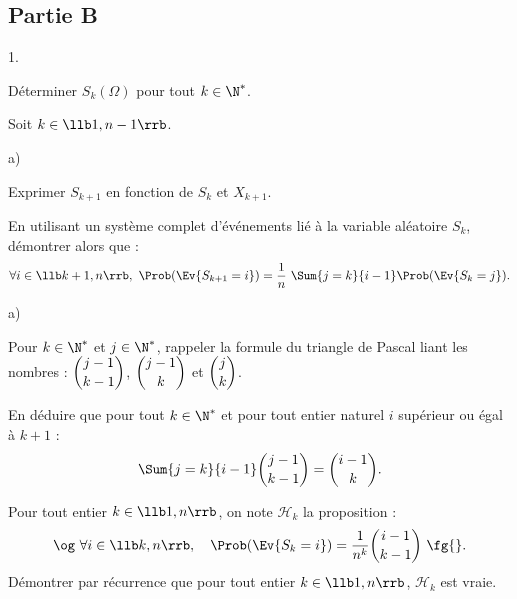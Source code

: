 

\subsection*{Partie B}

\begin{noliste}{1.}
  \setcounter{enumi}{4}
\item Déterminer $S_k(\Omega)$ pour tout $k\in\N^*$.
  
  




\item Soit $k\in\llb 1,n-1\rrb$.
  \begin{noliste}{a)}
  \item Exprimer $S_{k+1}$ en fonction de $S_k$ et $X_{k+1}$.
    
    
    
  \item En utilisant un système complet d'événements lié à la
    variable aléatoire $S_k$, démontrer alors que :
    \[
    \forall i \in\llb k+1,n\rrb, \ \Prob(\Ev{S_{k+1}=i}) =
    \dfrac{1}{n} \ \Sum{j=k}{i-1} \Prob(\Ev{S_k=j}).
    \]
    
    
  \end{noliste}
  
\item 
  \begin{noliste}{a)}
  \item Pour $k\in\N^*$ et $j\in\N^*$, rappeler la formule du triangle
    de Pascal liant les nombres : $\dbinom{j-1}{k-1}$,
    $\dbinom{j-1}{k}$ et $\dbinom{j}{k}$.
	
    
    
    \newpage

	
  \item En déduire que pour tout $k\in\N^*$ et pour tout entier
    naturel $i$ supérieur ou égal à $k+1$ :
    \[
    \Sum{j=k}{i-1} \dbinom{j-1}{k-1} = \dbinom{i-1}{k}.
    \]
    
    
    
    
    
    
  \item Pour tout entier $k\in\llb 1,n \rrb$, on note $\mathcal{H}_k$
    la proposition :
    \[
    \text{\og $\forall i\in\llb k,n\rrb, \quad 
      \Prob(\Ev{S_k=i})=\dfrac{1}{n^k} \dbinom{i-1}{k-1}$ \fg{}.}
    \]
    Démontrer par récurrence que pour tout entier $k\in\llb 1,n\rrb$,
    $\mathcal{H}_k$ est vraie.
    

\end{noliste}
\end{noliste}
